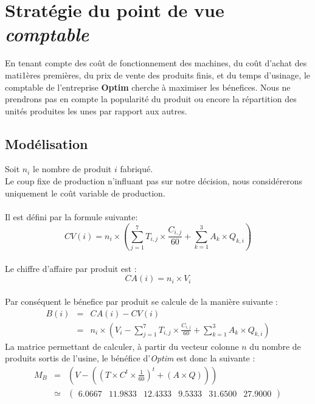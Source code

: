 \newpage
\section{Stratégie du point de vue \textsl{comptable}}
En tenant compte des coût de fonctionnement des machines, du coût d'achat des mati1ères premières,
du prix de vente des produits finis, et du temps d'usinage, le comptable de l'entreprise \textbf{Optim} cherche 
à maximiser les bénefices. Nous ne prendrons pas en compte la \og popularité \fg du produit ou encore
la répartition des unités produites les unes par rapport aux autres.

\subsection{Modélisation}
Soit $n_i$ le nombre de produit $i$ fabriqué.\\
Le coup fixe de production n'influant pas sur notre décision, nous considérerons uniquement le coût variable de
production.\\
~\\
Il est défini par la formule suivante:
\begin{displaymath}
	CV(i) = n_i \times \left (\sum_{j = 1}^{7} T_{i,j} \times 
	\frac{C_{i,j}}{60} + \sum_{k = 1}^{3} A_{k} \times Q_{k,i} \right )
\end{displaymath}
~\\
Le chiffre d'affaire par produit est :
\begin{displaymath}
	CA(i) = n_i \times V_i
\end{displaymath}
~\\
Par conséquent le bénefice par produit se calcule de la manière suivante :
\begin{eqnarray*}
	B(i)	&=& CA(i) - CV(i)\\
			&=& n_i  \times \left (V_i - \sum_{j = 1}^{7} T_{i,j} \times \frac{C_{i,j}}{60} +
	\sum_{k = 1}^{3} A_{k} \times Q_{k,i} \right )
\end{eqnarray*}
La matrice permettant de calculer, à partir du vecteur colonne $n$ du nombre de produits sortis de l'usine, le bénéfice
d'\emph{Optim} est donc la suivante :
\begin{eqnarray*}
	M_{B} &=&  \left(V - \left( \left(T \times C^{t} \times \frac{1}{60} \right)^{t} + \left(A \times Q\right) \right)\right) \\
		&\simeq& \begin{pmatrix} 6.0667 & 11.9833 & 12.4333 & 9.5333 & 31.6500 & 27.9000 \end{pmatrix}
\end{eqnarray*}

